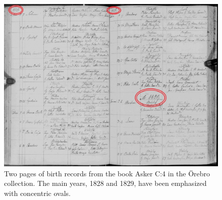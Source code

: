 
\begin{figure}
    \centering
    \includegraphics[scale=0.5]{resources/SWE_attention/S3HT-64P3-PQD.jpg}
    \caption{Two pages of birth records from the book Asker C:4 in the Örebro collection. The main years, 1828 and 1829, have been emphasized with concentric ovals.}
    \label{fig:page}
\end{figure}
